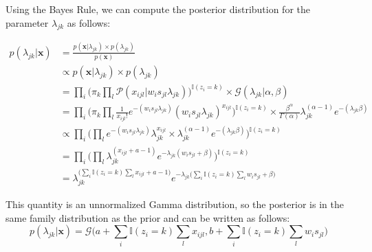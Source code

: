 Using the Bayes Rule, we can compute the posterior distribution for the parameter $\lambda_{jk}$ as follows:

\begin{equation} \label{posterior-poisson-bayes-rule-app}
  \begin{split}
  	p(\lambda_{jk} | \mathbf{x}) & = \frac{p(\mathbf{x}| \lambda_{jk}) \times p(\lambda_{jk})}{p(\mathbf{x})} \\
  		& \propto p(\mathbf{x}| \lambda_{jk}) \times p(\lambda_{jk}) \\
  		& = \prod_{i} \bigg(\pi_{k} \prod_{l} \mathcal{P}(x_{ijl} | w_{i}s_{jl} \lambda_{jk})\bigg)^{\mathbb{I}(z_{i}=k)} \times \mathcal{G}(\lambda_{jk}|\alpha, \beta) \\
  		& = \prod_{i} \bigg(\pi_{k} \prod_{l} \frac{1}{x_{ijl}!} e^{-(w_{i}s_{jl}\lambda_{jk})} (w_{i}s_{jl}\lambda_{jk})^{x_{ijl}}\bigg)^{\mathbb{I}(z_{i}=k)} \times \frac{\beta^{\alpha}}{\Gamma(\alpha)}\lambda_{jk}^{(\alpha-1)} e^{-(\lambda_{jk}\beta)} \\
		& \propto \prod_{i} \bigg(\prod_{l} e^{-(w_{i}s_{jl}\lambda_{jk})} \lambda_{jk}^{x_{ijl}} \times \lambda_{jk}^{(\alpha-1)} e^{-(\lambda_{jk}\beta)}\bigg)^{\mathbb{I}(z_{i}=k)} \\
		& = \prod_{i} \bigg(\prod_{l} \lambda_{jk}^{(x_{ijl} + a -1)} e^{-\lambda_{jk}(w_{i}s_{jl} + \beta)}\bigg)^{\mathbb{I}(z_{i}=k)} \\
		& = \lambda_{jk}^{\big(\sum\limits_{i} \mathbb{I}(z_{i}=k) \sum\limits_{l} x_{ijl} + a -1\big)} e^{-\lambda_{jk}\big(\sum\limits_{i} \mathbb{I}(z_{i}=k) \sum\limits_{l} w_{i}s_{jl} + \beta \big)}
  \end{split}
\end{equation}

This quantity is an unnormalized Gamma distribution, so the posterior is in the same family distribution as the prior and can be written as follows:
\begin{equation} \label{posterior-poisson-final-app}
  	p(\lambda_{jk} | \mathbf{x}) = \mathcal{G}\bigg(a + \sum\limits_{i} \mathbb{I}(z_{i}=k) \sum\limits_{l} x_{ijl}, b + \sum\limits_{i} \mathbb{I}(z_{i}=k) \sum\limits_{l} w_{i}s_{jl} \bigg)
\end{equation}
 

